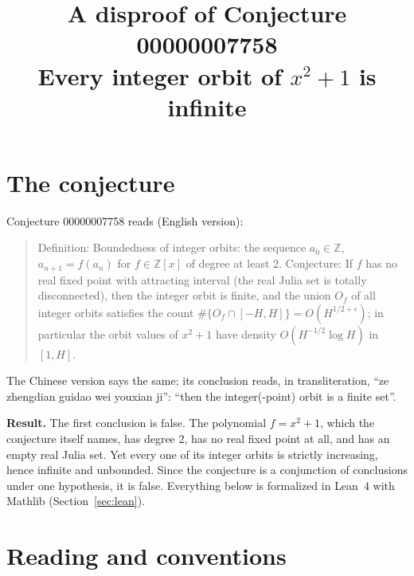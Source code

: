 \documentclass[11pt]{article}
\title{A disproof of Conjecture 00000007758\\[2pt]
\large Every integer orbit of $x^2+1$ is infinite}
\date{}
\renewcommand{\_}{\oldus\allowbreak}
\theoremstyle{definition}
\theoremstyle{remark}
\newcommand{\Z}{\mathbb{Z}}
\begin{document}
\sloppy
\maketitle

\section{The conjecture}

Conjecture 00000007758 reads (English version):

\begin{quote}
Definition: Boundedness of integer orbits: the sequence $a_0 \in \Z$, $a_{n+1}=f(a_n)$ for $f \in \Z[x]$
of degree at least 2. Conjecture: If $f$ has no real fixed point with attracting interval (the real
Julia set is totally disconnected), then the integer orbit is finite, and the union $O_f$ of all integer
orbits satisfies the count $\#\{O_f \cap [-H,H]\} = O(H^{1/2+\epsilon})$; in particular the orbit values
of $x^2+1$ have density $O(H^{-1/2}\log H)$ in $[1,H]$.
\end{quote}

The Chinese version says the same; its conclusion reads, in transliteration, ``ze zhengdian guidao
wei youxian ji'': ``then the integer(-point) orbit is a finite set''.

\textbf{Result.} The first conclusion is false. The polynomial $f = x^2+1$, which the conjecture itself
names, has degree 2, has no real fixed point at all, and has an empty real Julia set. Yet every one of
its integer orbits is strictly increasing, hence infinite and unbounded. Since the conjecture is a
conjunction of conclusions under one hypothesis, it is false. Everything below is formalized in
Lean~4 with Mathlib (Section~\ref{sec:lean}).

\section{Reading and conventions}\label{sec:reading}
\end{document}
